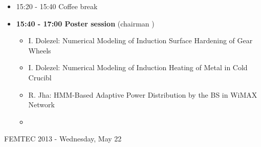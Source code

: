\documentclass[10pt, A4]{article}%
\begin{document}
\begin{itemize}
  \item 15:20 - 15:40 Coffee break
  \item {\bf 15:40 - 17:00 Poster session} (chairman )
  \begin{itemize}
    \item {I. Dolezel}: {Numerical Modeling of Induction Surface Hardening of Gear Wheels}
    \item {I. Dolezel}: {Numerical Modeling of Induction Heating of Metal in Cold Crucibl}
    \item {R. Jha}: {HMM-Based Adaptive Power Distribution by the BS in WiMAX Network}
    \item 
  \end{itemize}
   
\end{itemize}

\newpage

\centerline{\huge FEMTEC 2013 - Wednesday, May 22}
\vspace{4mm}
\end{document}
